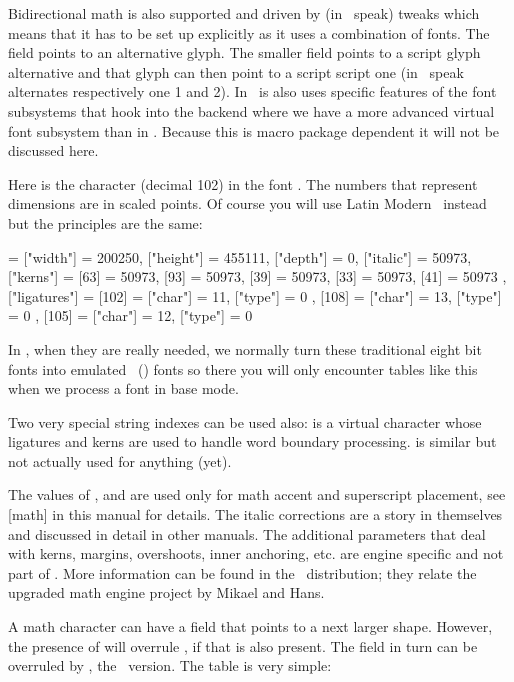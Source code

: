 {Bidirectional math is also supported and driven by (in \CONTEXT\ speak) tweaks
which means that it has to be set up explicitly as it uses a combination of
fonts. The  field points to an alternative glyph. The \type
{smaller} field points to a script glyph alternative and that glyph can then
point to a script script one (in \OPENTYPE\ speak  alternates
respectively one 1 and 2). In \CONTEXT\ is also uses specific features of the
font subsystems that hook into the backend where we have a more advanced virtual
font subsystem than in \LUATEX. Because this is macro package dependent it will
not be discussed here.

Here is the character  (decimal 102) in the font .
The numbers that represent dimensions are in scaled points. Of course you will
use Latin Modern \OPENTYPE\ instead but the principles are the same:

\starttyping[option=LUA]
[102] = {
    ["width"]  = 200250,
    ["height"] = 455111,
    ["depth"]  = 0,
    ["italic"] = 50973,
    ["kerns"]  = {
        [63] = 50973,
        [93] = 50973,
        [39] = 50973,
        [33] = 50973,
        [41] = 50973
    },
    ["ligatures"] = {
        [102] = { ["char"] = 11, ["type"] = 0 },
        [108] = { ["char"] = 13, ["type"] = 0 },
        [105] = { ["char"] = 12, ["type"] = 0 }
    }
}
\stoptyping

In \CONTEXT, when they are really needed, we normally turn these traditional
eight bit fonts into emulated \OPENTYPE\ (\UNICODE) fonts so there you will only
encounter tables like this when we process a font in base mode.

Two very special string indexes can be used also:  is a
virtual character whose ligatures and kerns are used to handle word boundary
processing.  is similar but not actually used for anything
(yet).

The values of ,  and  are
used only for math accent and superscript placement, see  [math] in
this manual for details. The italic corrections are a story in themselves and
discussed in detail in other manuals. The additional parameters that deal with
kerns, margins, overshoots, inner anchoring, etc. are engine specific and not
part of \OPENTYPE. More information can be found in the \CONTEXT\ distribution;
they relate the upgraded math engine project by Mikael and Hans.

A math character can have a  field that points to a next larger
shape. However, the presence of  will overrule , if
that is also present. The  field in turn can be overruled by
, the \OPENTYPE\ version. The  table is very
simple:

}

